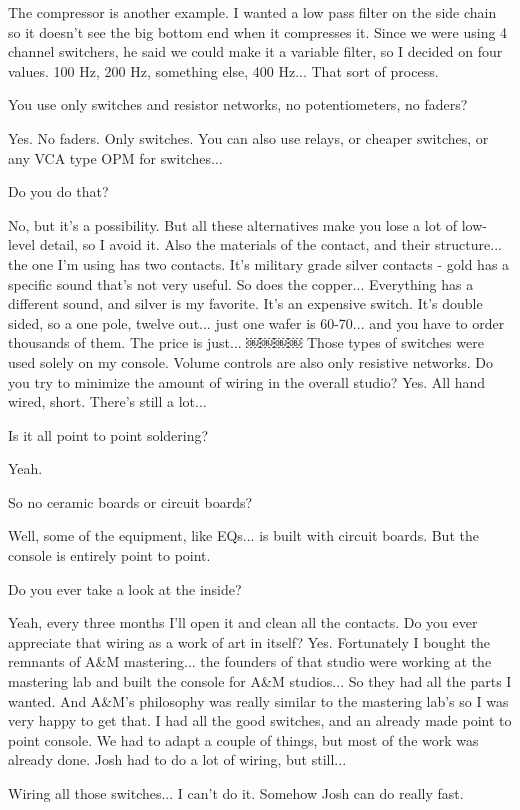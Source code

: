 The compressor is another example. I wanted a low pass filter on the side chain so it doesn't see the big bottom end when it compresses it. Since we were using 4 channel switchers, he said we could make it a variable filter, so I decided on four values. 100 Hz, 200 Hz, something else, 400 Hz... That sort of process.

You use only switches and resistor networks, no potentiometers, no faders?

Yes. No faders. Only switches. You can also use relays, or cheaper switches, or any VCA type OPM for switches...

Do you do that?

No, but it's a possibility. But all these alternatives make you lose a lot of low-level detail, so I avoid it. Also the materials of the contact, and their structure... the one I'm using has two contacts. It's military grade silver contacts - gold has a specific sound that's not very useful. So does the copper... Everything has a different sound, and silver is my favorite. It's an expensive switch. It's double sided, so a one pole, twelve out... just one wafer is 60-70... and you have to order thousands of them. The price is just...
￼￼￼￼
Those types of switches were used solely on my console. Volume controls are also only resistive networks.
Do you try to minimize the amount of wiring in the overall studio?
Yes. All hand wired, short. There's still a lot...

Is it all point to point soldering?

Yeah.

So no ceramic boards or circuit boards?

Well, some of the equipment, like EQs... is built with circuit boards. But the console is entirely point to point.

Do you ever take a look at the inside?

Yeah, every three months I'll open it and clean all the contacts.
Do you ever appreciate that wiring as a work of art in itself?
Yes. Fortunately I bought the remnants of A\&M mastering... the founders of that studio were working at the mastering lab and built the console for A\&M studios... So they had all the parts I wanted. And A\&M's philosophy was really similar to the mastering lab's so I was very happy to get that. I had all the good switches, and an already made point to point console. We had to adapt a couple of things, but most of the work was already done. Josh had to do a lot of wiring, but still...

Wiring all those switches... I can't do it. Somehow Josh can do really fast.

